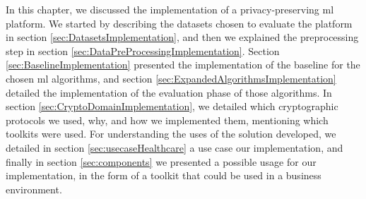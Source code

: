 In this chapter, we discussed the implementation of a privacy-preserving \ac{ml} platform. We started by describing the datasets chosen to evaluate the platform in section \ref{sec:DatasetsImplementation}, and then we explained the preprocessing step in section \ref{sec:DataPreProcessingImplementation}.
Section \ref{sec:BaselineImplementation} presented the implementation of the baseline for the chosen \ac{ml} algorithms, and section \ref{sec:ExpandedAlgorithmsImplementation} detailed the implementation of the evaluation phase of those algorithms.
In section \ref{sec:CryptoDomainImplementation}, we detailed which cryptographic protocols we used, why, and how we implemented them, mentioning which toolkits were used.
For understanding the uses of the solution developed, we detailed in section \ref{sec:usecaseHealthcare} a use case our implementation, and finally in section \ref{sec:components} we presented a possible usage for our implementation, in the form of a toolkit that could be used in a business environment.


